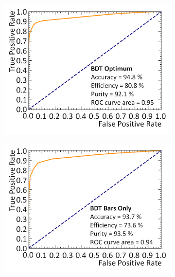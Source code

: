 \begin{figure}[!h]
\begin{subfigure}{.4\textwidth}
  \centering
  \includegraphics[width=\linewidth]{Chapter4.5/Figs/bdtOptimumRoc.png}
  \captionsetup{width=.9\linewidth}
  \caption{}
  \label{subFig:bdtOptimumRoc}
\end{subfigure}
\qquad
\begin{subfigure}{.4\textwidth}
  \centering
  \includegraphics[width=\linewidth]{Chapter4.5/Figs/bdtBarsOnlyRoc.png}
  \captionsetup{width=.9\linewidth}
  \caption{}
  \label{subFig:bdtBarsOnlyRoc}
\end{subfigure}
\begin{subfigure}{.4\textwidth}
  \centering

\end{subfigure}
\end{figure}
